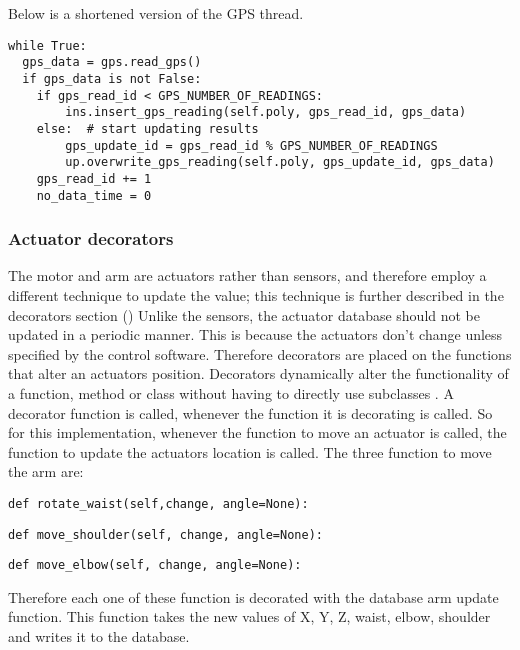 
Below is a shortened version of the GPS thread.
\begin{lstlisting}[style=custompython]
while True:
  gps_data = gps.read_gps()
  if gps_data is not False:
    if gps_read_id < GPS_NUMBER_OF_READINGS:
   		ins.insert_gps_reading(self.poly, gps_read_id, gps_data)
    else:  # start updating results
   		gps_update_id = gps_read_id % GPS_NUMBER_OF_READINGS
    	up.overwrite_gps_reading(self.poly, gps_update_id, gps_data)
    gps_read_id += 1
    no_data_time = 0
\end{lstlisting}

\subsubsection{Actuator decorators}

The motor and arm are actuators rather than sensors, and therefore employ a different technique to update the value; this technique is further described in the decorators section (\cite{decoratordefinition})
\newline
Unlike the sensors, the actuator database should not be updated in a periodic manner. This is because the actuators don't change unless specified by the control software. Therefore decorators are placed on the functions that alter an actuators position.
\newline
Decorators dynamically alter the functionality of a function, method or class without having to directly use subclasses \cite{decoratordefinition}. A decorator function is called, whenever the function it is decorating is called. So for this implementation, whenever the function to move an actuator is called, the function to update the actuators location is called.
\newline
The three function to move the arm are:
\begin{lstlisting}[style=custompython]
def rotate_waist(self,change, angle=None):  
\end{lstlisting}
\begin{lstlisting}[style=custompython]
def move_shoulder(self, change, angle=None):  
\end{lstlisting}
\begin{lstlisting}[style=custompython]
def move_elbow(self, change, angle=None):  
\end{lstlisting}
Therefore each one of these function is decorated with the database arm update function. This function takes the new values of X, Y, Z, waist, elbow, shoulder and writes it to the database. 
\newline
